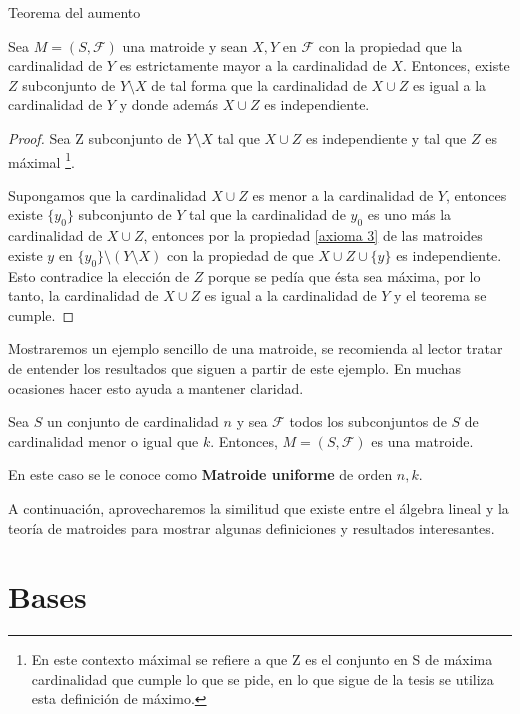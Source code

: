 \begin{teo}{Teorema del aumento} \label{augmentation}

Sea $M=(S,\mathcal{F})$ una matroide y sean $X,Y$ en $\mathcal{F}$ con la propiedad que la cardinalidad de $Y$ es estrictamente mayor a la cardinalidad de $X$. Entonces, existe $Z$ subconjunto de $Y \setminus X$ de tal forma que la cardinalidad de $X \cup Z$ es igual a la cardinalidad de $Y$ y donde además $X \cup Z$ es independiente. 
\end{teo}
\begin{proof}
Sea Z subconjunto de $Y \setminus X$ tal que $X \cup Z$ es independiente y tal que $Z$ es máximal \footnote{En este contexto máximal se refiere a que Z es el conjunto en S de máxima cardinalidad que cumple lo que se pide, en lo que sigue de la tesis se utiliza esta definición de máximo.}. 
 
Supongamos que la cardinalidad $X \cup Z$ es menor a la cardinalidad de $Y$, entonces existe $\{y_0\}$ subconjunto de $Y$ tal que la cardinalidad de $y_0$ es uno más la cardinalidad de $X \cup Z$, entonces por la propiedad \ref{axioma 3} de las matroides existe $y$ en $\{y_0\} \setminus (Y \setminus X)$ con la propiedad de que $X \cup Z \cup \{ y\}$ es independiente. Esto contradice la elección de $Z$ porque se pedía que ésta sea máxima, por lo tanto, la cardinalidad de $X \cup Z$ es igual a la cardinalidad de $Y$ y el teorema se cumple. 
\end{proof}

Mostraremos un ejemplo sencillo de una matroide, se recomienda al lector tratar de entender los resultados que siguen a partir de este ejemplo. En muchas ocasiones hacer esto ayuda a mantener claridad.

\begin{eje}
Sea $S$ un conjunto de cardinalidad $n$ y sea $\mathcal{F}$ todos los subconjuntos de $S$ de cardinalidad menor o igual que $k$. Entonces, $M=(S,\mathcal{F})$ es una matroide. 

En este caso se le conoce como  \textbf{Matroide uniforme} de orden $n,k$.
\fin
\end{eje}

A continuación, aprovecharemos la similitud que existe entre el álgebra lineal y la teoría de matroides para mostrar algunas definiciones y resultados interesantes. 

\section{Bases}


